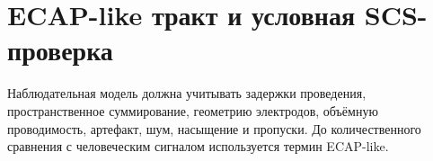 \chapter{ECAP-like тракт и условная SCS-проверка}

Наблюдательная модель должна учитывать задержки проведения, пространственное суммирование,
геометрию электродов, объёмную проводимость, артефакт, шум, насыщение и пропуски.
До количественного сравнения с человеческим сигналом используется термин ECAP-like.

